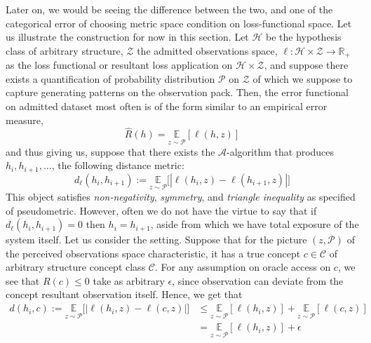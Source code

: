 Later on, we would be seeing the difference between the two, and one of the categorical error of choosing metric space condition on loss-functional space. Let us illustrate the construction for now in this section. Let $\mathcal{H}$ be the hypothesis class of arbitrary structure, $\mathcal{Z}$ the admitted observations space, $\ell :\mathcal{H}\times \mathcal{Z}\to \mathbb{R}_{+}$ as the loss functional or resultant loss application on $\mathcal{H}\times \mathcal{Z}$, and suppose there exists a quantification of probability distribution $\mathcal{P}$ on $\mathcal{Z}$ of which we suppose to capture generating patterns on the observation pack. Then, the error functional on admitted dataset most often is of the form similar to an empirical error measure,
\begin{equation}
    \hat{R}(h) = \underset{z\sim \mathcal{P}}{\mathbb{E}} [\ell(h,z)]
\end{equation}
and thus giving us, suppose that there exists the $\mathcal{A}$-algorithm that produces $h_{i},h_{i+1},\dots$, the following distance metric:
\begin{equation}
    d_{\ell} (h_{i},h_{i+1}) := \underset{z\sim \mathcal{P}}{\mathbb{E}} \Big[ | \ell(h_{i},z) - \ell(h_{i+1},z) | \Big]
\end{equation}
This object satisfies \textit{non-negativity}, \textit{symmetry}, and \textit{triangle inequality} as specified of pseudometric. However, often we do not have the virtue to say that if $d_{\ell}(h_{i},h_{i+1})=0$ then $h_{i}=h_{i+1}$, aside from which we have total exposure of the system itself. Let us consider the setting. Suppose that for the picture $(z,\mathcal{P})$ of the perceived observations space characteristic, it has a true concept $c\in\mathcal{C}$ of arbitrary structure concept class $\mathcal{C}$. For any assumption on oracle access on $c$, we see that $R(c)\leq 0$ take as arbitrary $\epsilon$, since observation can deviate from the concept resultant observation itself. Hence, we get that 
\begin{equation}
    \begin{split}
        d(h_{i},c) := \underset{z\sim \mathcal{P}}{\mathbb{E}} \Big[ | \ell(h_{i},z) - \ell(c,z) | \Big] &\leq \underset{z\sim \mathcal{P}}{\mathbb{E}} [\ell(h_{i},z)] + \underset{z\sim \mathcal{P}}{\mathbb{E}} [\ell(c,z)] \\
        & = \underset{z\sim \mathcal{P}}{\mathbb{E}} [\ell(h_{i},z)] + \epsilon
    \end{split}
\end{equation}

